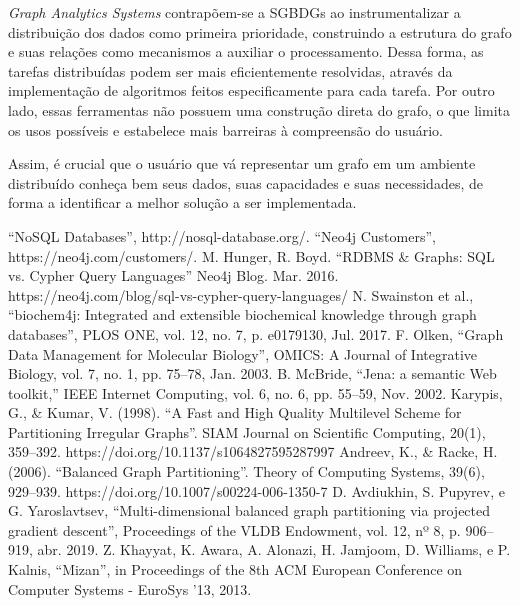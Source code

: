 \documentclass[conference]{IEEEtran}
\begin{document}
\emph{Graph Analytics Systems} contrapõem-se a SGBDGs ao instrumentalizar a
distribuição dos dados como primeira prioridade, construindo a estrutura do
grafo e suas relações como mecanismos a auxiliar o processamento. Dessa forma,
as tarefas distribuídas podem ser mais eficientemente resolvidas, através da
implementação de algoritmos feitos especificamente para cada tarefa. Por outro
lado, essas ferramentas não possuem uma construção direta do grafo, o que
limita os usos possíveis e estabelece mais barreiras à compreensão do usuário.

Assim, é crucial que o usuário que vá representar um grafo em um ambiente
distribuído conheça bem seus dados, suas capacidades e suas necessidades,
de forma a identificar a melhor solução a ser implementada.

\begin{thebibliography}{00}
 ``NoSQL Databases'', http://nosql-database.org/.
 ``Neo4j Customers'',
    https://neo4j.com/customers/.
 M. Hunger, R. Boyd. ``RDBMS \& Graphs: SQL vs.
    Cypher Query Languages'' Neo4j Blog. Mar. 2016.
        https://neo4j.com/blog/sql-vs-cypher-query-languages/
 N. Swainston et al., ``biochem4j: Integrated and
    extensible biochemical knowledge through graph databases'', PLOS
        ONE, vol. 12, no. 7, p. e0179130, Jul. 2017.
 F. Olken, ``Graph Data Management for Molecular
    Biology'', OMICS: A Journal of Integrative Biology, vol. 7, no. 1,
        pp. 75–78, Jan. 2003.
 B. McBride, ``Jena: a semantic Web toolkit,” IEEE
    Internet Computing, vol. 6, no. 6, pp. 55–59, Nov. 2002.
 Karypis, G., \& Kumar, V. (1998). ``A Fast and High
    Quality Multilevel Scheme for Partitioning Irregular Graphs''. SIAM
        Journal on Scientific Computing, 20(1), 359–392.
        https://doi.org/10.1137/s1064827595287997
 Andreev, K., \& Racke, H. (2006). ``Balanced
    Graph Partitioning''. Theory of Computing Systems, 39(6), 929–939.
        https://doi.org/10.1007/s00224-006-1350-7
 D. Avdiukhin, S. Pupyrev, e G. Yaroslavtsev,
    ``Multi-dimensional balanced graph partitioning via projected
        gradient descent'', Proceedings of the VLDB Endowment, vol. 12,
        nº 8, p. 906–919, abr. 2019.
 Z. Khayyat, K. Awara, A. Alonazi, H. Jamjoom, D.
    Williams, e P. Kalnis, ``Mizan'', in Proceedings of the 8th ACM
        European Conference on Computer Systems - EuroSys ’13, 2013.

\end{thebibliography}
\end{document}
